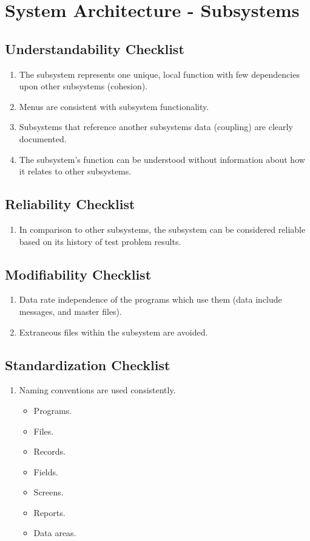 \chapter{System Architecture - Subsystems}
 \section {Understandability Checklist}
 \begin{enumerate}
  \item The subsystem represents one unique, local function with few
    dependencies upon other subsystems (cohesion).
  \item Menus are consistent with subsystem functionality.
  \item Subsystems that reference another subsystems data (coupling)
    are clearly documented.
  \item The subsystem's function can be understood without information
    about how it relates to other subsystems.
 \end{enumerate}
 \section {Reliability Checklist}
 \begin{enumerate}
  \item In comparison to other subsystems, the subsystem can be considered
    reliable based on its history of test problem results.
 \end{enumerate}
 \section {Modifiability Checklist}
 \begin{enumerate}
  \item Data rate independence of the programs which use them (data
    include messages, and master files).
  \item Extraneous files within the subsystem are avoided.
 \end{enumerate}
 \section {Standardization Checklist}
 \begin{enumerate}
  \item Naming conventions are used consistently.
  \begin{itemize}
   \item Programs.
   \item Files.
   \item Records.
   \item Fields.
   \item Screens.
   \item Reports.
   \item Data areas.
  \end{itemize}
 \end{enumerate}
